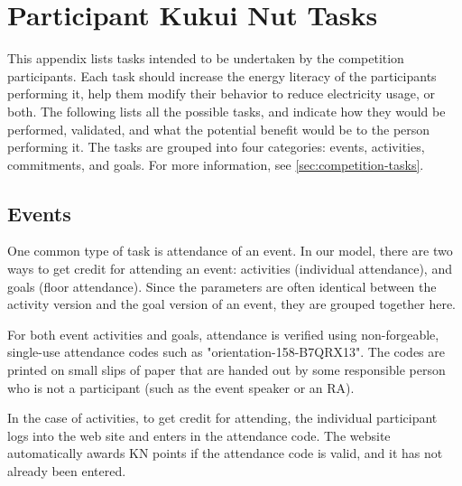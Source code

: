 
\chapter{Participant Kukui Nut Tasks}
\label{app:tasks}

This appendix lists tasks intended to be undertaken by the competition participants. Each task should increase the energy literacy of the participants performing it, help them modify their behavior to reduce electricity usage, or both. The following lists all the possible tasks, and indicate how they would be performed, validated, and what the potential benefit would be to the person performing it. The tasks are grouped into four categories: events, activities, commitments, and goals. For more information, see \autoref{sec:competition-tasks}.


\section{Events}

One common type of task is attendance of an event. In our model, there are two ways to get credit for attending an event: activities (individual attendance), and goals (floor attendance). Since the parameters are often identical between the activity version and the goal version of an event, they are grouped together here.

For both event activities and goals, attendance is verified using non-forgeable, single-use attendance codes such as "orientation-158-B7QRX13". The codes are printed on small slips of paper that are handed out by some responsible person who is not a participant (such as the event speaker or an RA).

In the case of activities, to get credit for attending, the individual participant logs into the web site and enters in the attendance code. The website automatically awards KN points if the attendance code is valid, and it has not already been entered.

